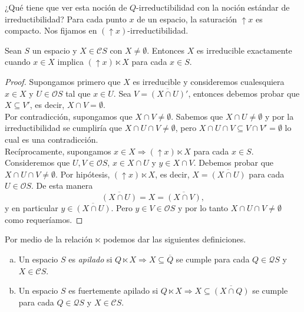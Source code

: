 ¿Qué tiene que ver esta noción de $Q$-irreductibilidad con la noción estándar de irreductibilidad? Para cada punto $x$ de un espacio, la saturación $\uparrow x$ es compacto. Nos fijamos en $(\uparrow x)$-irreductibilidad.

\begin{lem}\label{Lema8.5.4}
    Sean $S$ un espacio y $X\in \mathcal{C}S$ con $X\neq \emptyset$. Entonces $X$ es irreducible exactamente cuando $x\in X$  implica $(\uparrow x)\ltimes X$ para cada $x\in S$.
\end{lem}

\begin{proof}
    Supongamos primero que $X$ es irreducible y consideremos cualesquiera $x\in X$ y $U\in \mathcal{O}S$ tal que $x\in U$. Sea $V=\overline{(X\cap U)}'$, entonces debemos probar que $X\subseteq V'$, es decir, $X\cap V=\emptyset$.\\

    Por contradicción, supongamos que $X\cap V\neq \emptyset$. Sabemos que $X\cap U\neq \emptyset$ y por la irreductibilidad se cumpliría que $X\cap U\cap V\neq \emptyset$, pero $X\cap U\cap V\subseteq V\cap V'=\emptyset$ lo cual es una contradicción.\\

    Recíprocamente, supongamos $x\in X\Rightarrow (\uparrow x)\ltimes X$ para cada $x\in S$. Consideremos que $U, V\in \mathcal{O}S$, $x\in X\cap U$ y $y\in X\cap V$. Debemos probar que $X\cap U\cap V\neq \emptyset$. Por hipótesis, $(\uparrow x)\ltimes X$, es decir, $X=\overline{(X\cap U)}$ para cada $U\in \mathcal{O}S$. De esta manera 
    \[
    \overline{(X\cap U)}=X=\overline{(X\cap V)},
    \]
    y en particular $y\in \overline{(X\cap U)}$. Pero $y\in V\in \mathcal{O}S$ y por lo tanto $X\cap U\cap V\neq \emptyset$ como requeríamos. 
\end{proof}

Por medio de la relación $\ltimes$ podemos dar las siguientes definiciones.

\begin{dfn}\label{Definicion8.5.5}
    \begin{enumerate}[a)]
        \item Un espacio $S$ es \emph{apilado} si $Q\ltimes X \Rightarrow X\subseteq \overline{Q}$ se cumple para cada $Q\in \mathcal{Q}S$ y $X\in \mathcal{C}S$.
        
        \item Un espacio $S$ es fuertemente apilado si $Q\ltimes X \Rightarrow X\subseteq \overline{(X\cap Q)}$ se cumple para cada $Q\in \mathcal{Q}S$ y $X\in \mathcal{C}S$. 
    \end{enumerate}
\end{dfn}

